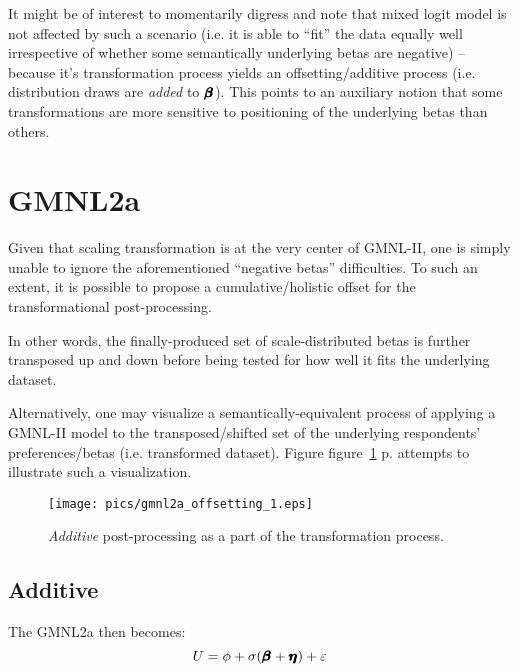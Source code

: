 \documentclass[12pt,a4paper]{article}
\begin{document}
It might be of interest to momentarily digress and note that mixed logit model is not affected by such a scenario (i.e. it is able to ``fit'' the data equally well irrespective of whether some semantically underlying betas are negative) -- because it's transformation process yields an offsetting/additive process (i.e. distribution draws are \textit{added} to \(\pmb{\hm{\beta}}\)). This points to an auxiliary notion that some transformations are more sensitive to positioning of the underlying betas than others.


\section{GMNL2a}

Given that scaling transformation is at the very center of GMNL-II, one is simply unable to ignore the aforementioned ``negative betas'' difficulties. To such an extent, it is possible to propose a cumulative/holistic offset for the transformational post-processing. 

In other words, the finally-produced set of scale-distributed betas is further transposed up and down before being tested for how well it fits the underlying dataset. 

Alternatively, one may visualize a semantically-equivalent process of applying a GMNL-II model to the transposed/shifted set of the underlying respondents' preferences/betas  (i.e. transformed dataset). Figure figure~\ref{fig:gmnl2a_offsetting_1} p.\pageref{fig:gmnl2a_offsetting_1} attempts to illustrate such a visualization.

\begin{figure}[H]
\begin{framed}
\texttt{[image: pics/gmnl2a\_offsetting\_1.eps]}
\caption{\textit{Additive} post-processing as a part of the transformation process.} 
\label{fig:gmnl2a_offsetting_1}
\end{framed}
\end{figure}

\subsection{Additive}

The GMNL2a then becomes:
{ \Large 
\begin{equation}
\label{eq:gmnl_2a_1}
U=\phi + \sigma(\pmb{\hm{\beta}}+\pmb{\hm{\eta}}) + \varepsilon
\end{equation}
}
\end{document}
